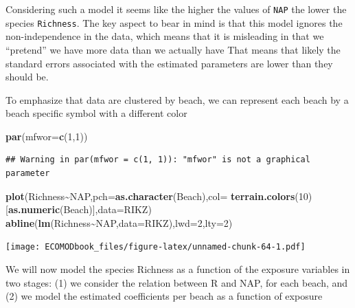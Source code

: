 \documentclass[
]{book}
\newenvironment{Shaded}{\begin{snugshade}}{\end{snugshade}}
\newcommand{\AttributeTok}[1]{\textcolor[rgb]{0.13,0.29,0.53}{#1}}
\newcommand{\DecValTok}[1]{\textcolor[rgb]{0.00,0.00,0.81}{#1}}
\newcommand{\FunctionTok}[1]{\textcolor[rgb]{0.13,0.29,0.53}{\textbf{#1}}}
\newcommand{\NormalTok}[1]{#1}
\newcommand{\SpecialCharTok}[1]{\textcolor[rgb]{0.81,0.36,0.00}{\textbf{#1}}}
\begin{document}
Considering such a model it seems like the higher the values of \texttt{NAP} the lower the species \texttt{Richness}. The key aspect to bear in mind is that this model ignores the non-independence in the data, which means that it is misleading in that we ``pretend'' we have more data than we actually have That means that likely the standard errors associated with the estimated parameters are lower than they should be.

To emphasize that data are clustered by beach, we can represent each beach by a beach specific symbol with a different color

\begin{Shaded}
\begin{Highlighting}[]
\FunctionTok{par}\NormalTok{(}\AttributeTok{mfwor=}\FunctionTok{c}\NormalTok{(}\DecValTok{1}\NormalTok{,}\DecValTok{1}\NormalTok{))}
\end{Highlighting}
\end{Shaded}

\begin{verbatim}
## Warning in par(mfwor = c(1, 1)): "mfwor" is not a graphical parameter
\end{verbatim}

\begin{Shaded}
\begin{Highlighting}[]
\FunctionTok{plot}\NormalTok{(Richness}\SpecialCharTok{\textasciitilde{}}\NormalTok{NAP,}\AttributeTok{pch=}\FunctionTok{as.character}\NormalTok{(Beach),}\AttributeTok{col=} \FunctionTok{terrain.colors}\NormalTok{(}\DecValTok{10}\NormalTok{)[}\FunctionTok{as.numeric}\NormalTok{(Beach)],}\AttributeTok{data=}\NormalTok{RIKZ)}
\FunctionTok{abline}\NormalTok{(}\FunctionTok{lm}\NormalTok{(Richness}\SpecialCharTok{\textasciitilde{}}\NormalTok{NAP,}\AttributeTok{data=}\NormalTok{RIKZ),}\AttributeTok{lwd=}\DecValTok{2}\NormalTok{,}\AttributeTok{lty=}\DecValTok{2}\NormalTok{)}
\end{Highlighting}
\end{Shaded}

\texttt{[image: ECOMODbook\_files/figure-latex/unnamed-chunk-64-1.pdf]}

We will now model the species Richness as a function of the exposure variables in two stages: (1) we consider the relation between R and NAP, for each beach, and (2) we model the estimated coefficients per beach as a function of exposure
\end{document}

